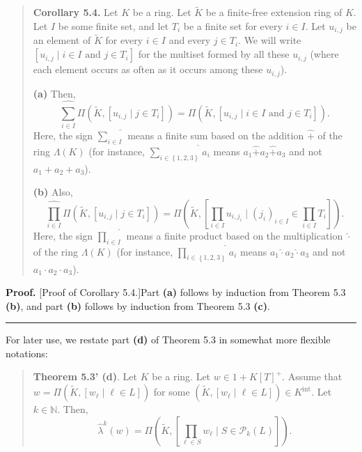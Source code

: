 \documentclass[numbers=enddot,12pt,final,onecolumn,notitlepage]{scrartcl}%
\newenvironment{proof}[1][Proof]{\noindent\textbf{#1.} }{\ \rule{0.5em}{0.5em}}
\begin{document}
\begin{quote}
\textbf{Corollary 5.4.} Let $K$ be a ring. Let $\widetilde{K}$ be a
finite-free extension ring of $K$. Let $I$ be some finite set, and let $T_{i}$
be a finite set for every $i\in I$. Let $u_{i,j}$ be an element of
$\widetilde{K}$ for every $i\in I$ and every $j\in T_{i}$. We will write
$\left[  u_{i,j}\mid i\in I\text{ and }j\in T_{i}\right]  $ for the multiset
formed by all these $u_{i,j}$ (where each element occurs as often as it occurs
among these $u_{i,j}$).

\textbf{(a)} Then,%
\[
\widehat{\sum_{i\in I}}\Pi\left(  \widetilde{K},\left[  u_{i,j}\mid j\in
T_{i}\right]  \right)  =\Pi\left(  \widetilde{K},\left[  u_{i,j}\mid i\in
I\text{ and }j\in T_{i}\right]  \right)  .
\]
Here, the sign $\widehat{\sum\limits_{i\in I}}$ means a finite sum based on
the addition $\widehat{+}$ of the ring $\Lambda\left(  K\right)  $ (for
instance, $\widehat{\sum\limits_{i\in\left\{  1,2,3\right\}  }}a_{i}$ means
$a_{1}\widehat{+}a_{2}\widehat{+}a_{3}$ and not $a_{1}+a_{2}+a_{3}$).

\textbf{(b)} Also,%
\[
\widehat{\prod_{i\in I}}\Pi\left(  \widetilde{K},\left[  u_{i,j}\mid j\in
T_{i}\right]  \right)  =\Pi\left(  \widetilde{K},\left[  \prod_{i\in
I}u_{i,j_{i}}\mid\left(  j_{i}\right)  _{i\in I}\in\prod_{i\in I}T_{i}\right]
\right)  .
\]
Here, the sign $\widehat{\prod\limits_{i\in I}}$ means a finite product based
on the multiplication $\widehat{\cdot}$ of the ring $\Lambda\left(  K\right)
$ (for instance, $\widehat{\prod\limits_{i\in\left\{  1,2,3\right\}  }}a_{i}$
means $a_{1}\widehat{\cdot}a_{2}\widehat{\cdot}a_{3}$ and not $a_{1}\cdot
a_{2}\cdot a_{3}$).
\end{quote}

\begin{proof}
[Proof of Corollary 5.4.]Part \textbf{(a)} follows by induction from Theorem
5.3 \textbf{(b)}, and part \textbf{(b)} follows by induction from Theorem 5.3
\textbf{(c)}.
\end{proof}

For later use, we restate part \textbf{(d)} of Theorem 5.3 in somewhat more
flexible notations:

\begin{quote}
\textbf{Theorem 5.3' (d)}. Let $K$ be a ring. Let $w\in1+K\left[  T\right]
^{+}$. Assume that $w=\Pi\left(  \widetilde{K},\left[  w_{\ell}\mid\ell\in
L\right]  \right)  $ for some $\left(  \widetilde{K},\left[  w_{\ell}\mid
\ell\in L\right]  \right)  \in K^{\operatorname*{int}}$. Let $k\in\mathbb{N}$.
Then,%
\[
\widehat{\lambda}^{k}\left(  w\right)  =\Pi\left(  \widetilde{K},\left[
\prod_{\ell\in S}w_{\ell}\mid S\in\mathcal{P}_{k}\left(  L\right)  \right]
\right)  .
\]



\end{quote}
\end{document}
